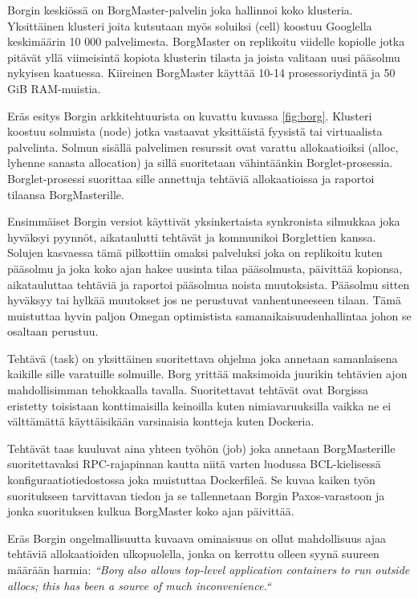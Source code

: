\documentclass[finnish,gradu]{tktltiki3}
\begin{document}
Borgin keskiössä on BorgMaster-palvelin joka hallinnoi koko klusteria. Yksittäinen klusteri joita kutsutaan myös soluiksi (cell) koostuu Googlella keskimäärin 10 000 palvelimesta. BorgMaster on replikoitu viidelle kopiolle jotka pitävät yllä viimeisintä kopiota klusterin tilasta ja joista valitaan uusi pääsolmu nykyisen kaatuessa. Kiireinen BorgMaster käyttää 10-14 prosessoriydintä ja 50 GiB RAM-muistia.

Eräs esitys Borgin arkkitehtuurista on kuvattu kuvassa \ref{fig:borg}. Klusteri koostuu solmuista (node) jotka vastaavat yksittäistä fyysistä tai virtuaalista palvelinta. Solmun sisällä palvelimen resurssit ovat varattu allokaatioiksi (alloc, lyhenne sanasta allocation) ja sillä suoritetaan vähintäänkin Borglet-prosessia. Borglet-prosessi suorittaa sille annettuja tehtäviä allokaatioissa ja raportoi tilaansa BorgMasterille.

Ensimmäiset Borgin versiot käyttivät yksinkertaista synkronista silmukkaa joka hyväksyi pyynnöt, aikataulutti tehtävät ja kommunikoi Borglettien kanssa. Solujen kasvaessa tämä pilkottiin omaksi palveluksi joka on replikoitu kuten pääsolmu ja joka koko ajan hakee uusinta tilaa pääsolmusta, päivittää kopionsa, aikatauluttaa tehtäviä ja raportoi pääsolmua noista muutoksista. Pääsolmu sitten hyväksyy tai hylkää muutokset jos ne perustuvat vanhentuneeseen tilaan. Tämä muistuttaa hyvin paljon Omegan optimistista samanaikaisuudenhallintaa johon se osaltaan perustuu.

Tehtävä (task) on yksittäinen suoritettava ohjelma joka annetaan samanlaisena kaikille sille varatuille solmuille. Borg yrittää maksimoida juurikin tehtävien ajon mahdollisimman tehokkaalla tavalla. Suoritettavat tehtävät ovat Borgissa eristetty toisistaan konttimaisilla keinoilla kuten nimiavaruuksilla vaikka ne ei välttämättä käyttäisikään varsinaisia kontteja kuten Dockeria.

Tehtävät taas kuuluvat aina yhteen työhön (job) joka annetaan BorgMasterille suoritettavaksi RPC-rajapinnan kautta niitä varten luodussa BCL-kielisessä konfiguraatiotiedostossa joka muistuttaa Dockerfileä. Se kuvaa kaiken työn suoritukseen tarvittavan tiedon ja se tallennetaan Borgin Paxos-varastoon ja jonka suorituksen kulkua BorgMaster koko ajan päivittää.

Eräs Borgin ongelmallisuutta kuvaava ominaisuus on ollut mahdollisuus ajaa tehtäviä allokaatioiden ulkopuolella, jonka on kerrottu olleen syynä suureen määrään harmia: \textit{``Borg also allows top-level application containers to run outside allocs; this has been a source of much inconvenience.``}
\end{document}
